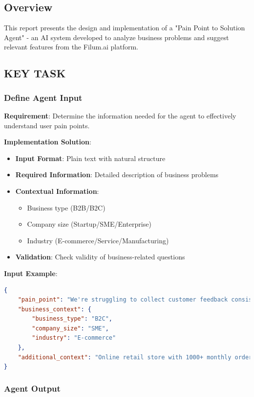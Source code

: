 \documentclass[12pt,a4paper]{article}
\begin{document}
\subsection{Overview}

This report presents the design and implementation of a "Pain Point to Solution Agent" - an AI system developed to analyze business problems and suggest relevant features from the Filum.ai platform.

\subsection{KEY TASK}
\subsubsection{Define Agent Input}

\textbf{Requirement}: Determine the information needed for the agent to effectively understand user pain points.

\textbf{Implementation Solution}:
\begin{itemize}
    \item \textbf{Input Format}: Plain text with natural structure
    \item \textbf{Required Information}: Detailed description of business problems
    \item \textbf{Contextual Information}: 
    \begin{itemize}
        \item Business type (B2B/B2C)
        \item Company size (Startup/SME/Enterprise)
        \item Industry (E-commerce/Service/Manufacturing)
    \end{itemize}
    \item \textbf{Validation}: Check validity of business-related questions
\end{itemize}

\textbf{Input Example}:
\begin{lstlisting}[language=json, caption=Input Pain Point Example]
{
    "pain_point": "We're struggling to collect customer feedback consistently after a purchase",
    "business_context": {
        "business_type": "B2C",
        "company_size": "SME",
        "industry": "E-commerce"
    },
    "additional_context": "Online retail store with 1000+ monthly orders"
}
\end{lstlisting}

\newpage
\subsubsection{Agent Output}
\end{document}

